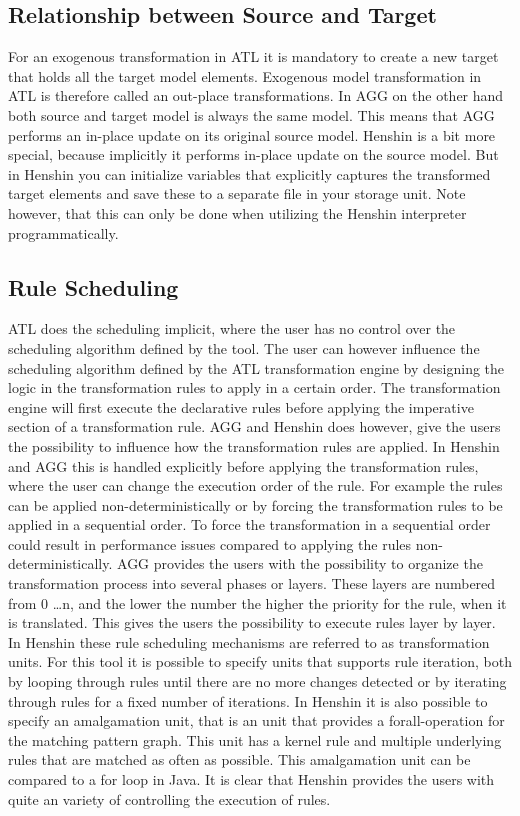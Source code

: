\subsection{Relationship between Source and Target}
For an exogenous transformation in ATL it is mandatory to create a new target
that holds all the target model elements. Exogenous model transformation in ATL
is therefore called an out-place transformations. In AGG on the other hand both
source and target model is always the same model. This means that AGG performs an
in-place update on its original source model. Henshin is a bit more special,
because implicitly it performs in-place update on the source model. But in
Henshin you can initialize variables that explicitly captures the transformed
target elements and save these to a separate file in your storage unit. Note
however, that this can only be done when utilizing the Henshin interpreter
programmatically. 

\subsection{Rule Scheduling}

ATL does the scheduling implicit, where the user has no control over the
scheduling algorithm defined by the tool. The user can however influence the scheduling
algorithm defined by the ATL transformation engine by designing the logic in the
transformation rules to apply in a certain order. The transformation
engine will first execute the declarative rules before applying the imperative
section of a transformation rule. AGG and Henshin does however, give the
users the possibility to influence how the transformation rules are applied. 
In Henshin and AGG this is handled explicitly before applying the transformation
rules, where the user can change the execution order of the rule.
For example the rules can be applied non-deterministically or by forcing the
transformation rules to be applied in a sequential order. To force the
transformation in a sequential order could result in performance issues compared
to applying the rules non-deterministically. AGG provides the users with the
possibility to organize the transformation process into several phases or
layers. These layers are numbered from 0 \ldots n, and the lower the number the
higher the priority for the rule, when it is translated. This gives the users
the possibility to execute rules layer by layer. In Henshin these rule scheduling
mechanisms are referred to as transformation units. For this tool it is possible
to specify units that supports rule iteration, both by looping through rules
until there are no more changes detected or by iterating through rules for a
fixed number of iterations. In Henshin it is also possible to specify an
amalgamation unit, that is an unit that provides a forall-operation for the
matching pattern graph. This unit has a kernel rule and multiple underlying
rules that are matched as often as possible. This amalgamation unit can be
compared to a for loop in Java. It is clear that Henshin provides the users with
quite an variety of controlling the execution of rules.

